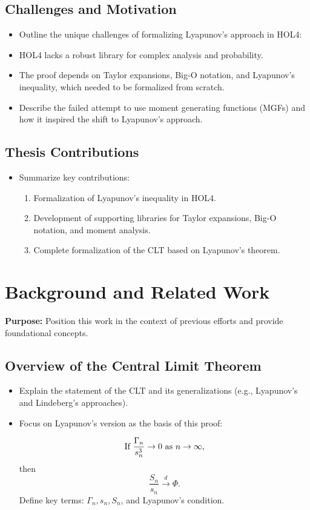 \subsection{Challenges and Motivation}
\begin{itemize}
    \item Outline the unique challenges of formalizing Lyapunov’s approach in HOL4:
    \item HOL4 lacks a robust library for complex analysis and probability.
    \item The proof depends on Taylor expansions, Big-O notation, and Lyapunov’s inequality, which needed to be formalized from scratch.
    \item Describe the failed attempt to use moment generating functions (MGFs) and how it inspired the shift to Lyapunov’s approach.
\end{itemize}    
   
\subsection{Thesis Contributions}
\begin{itemize}
    \item Summarize key contributions:
    \begin{enumerate}
        \item Formalization of Lyapunov’s inequality in HOL4.
        \item Development of supporting libraries for Taylor expansions, Big-O notation, and moment analysis.
        \item Complete formalization of the CLT based on Lyapunov’s theorem.
    \end{enumerate}
\end{itemize}

\section{Background and Related Work}
\textbf{Purpose:} Position this work in the context of previous efforts and provide foundational concepts.
\subsection{Overview of the Central Limit Theorem}
\begin{itemize}
    \item Explain the statement of the CLT and its generalizations (e.g., Lyapunov’s and Lindeberg’s approaches).
    \item Focus on Lyapunov’s version as the basis of this proof:
    
     \begin{equation}
     \text{If } \frac{\Gamma_n}{s_n^3} \to 0 \text{ as } \space \space n \to \infty, 
     \end{equation}
     then 
     \[
     \frac{S_n}{s_n} \xrightarrow{d} \Phi. 
     \] 
     Define key terms: \( \Gamma_n, s_n, S_n \), and Lyapunov’s condition.
\end{itemize}
   
